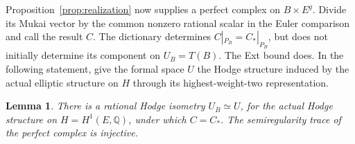 \documentclass[11pt]{article}
\numberwithin{equation}{section}
\newtheorem{lemma}[theorem]{Lemma}
\theoremstyle{definition}
\theoremstyle{remark}
\newcommand{\Q}{\mathbb Q}
\begin{document}
Proposition~\ref{prop:realization} now supplies a perfect
complex on $B\times E^g$.  Divide its Mukai vector by the
common nonzero rational scalar in the Euler comparison and
call the result $C$.  The dictionary determines
$C|_{P_B}=C_*|_{P_B}$, but does not initially determine
its component on $U_B=T(B)$.  The Ext bound does.  In the
following statement, give the formal space $U$ the Hodge
structure induced by the actual elliptic structure on $H$
through its highest-weight-two representation.

\begin{lemma}
 \label{ks:exactness}
There is a rational Hodge isometry $U_B\simeq U$, for the
actual Hodge structure on $H=H^1(E,\Q)$, under which
$C=C_*$.  The semiregularity trace of the perfect complex
is injective.
\end{lemma}
\end{document}
